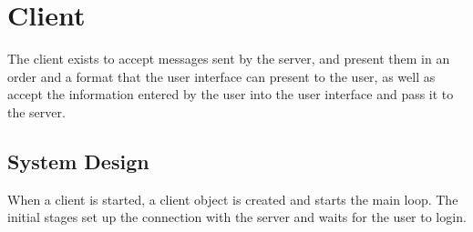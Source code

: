 \section{Client}
\label{sec:client}

The client exists to accept messages sent by the server, and present them in an
order and a format that the user interface can present to the user, as well as
accept the information entered by the user into the user interface and pass it
to the server.

\subsection{System Design}
\label{sub:client_system_design}

When a client is started, a client object is created and starts the main loop.
The initial stages set up the connection with the server and waits for the
user to login.
